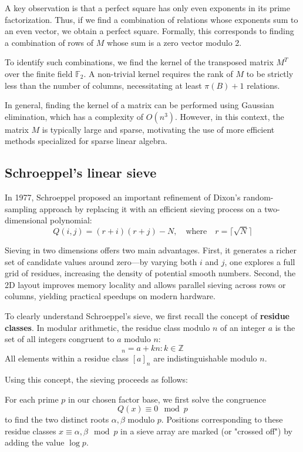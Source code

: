 \documentclass[a4paper, 11pt]{article}
\begin{document}
A key observation is that a perfect square has only even exponents in its prime factorization. Thus, if we find a combination of relations whose exponents sum to an even vector, we obtain a perfect square. Formally, this corresponds to finding a combination of rows of $M$ whose sum is a zero vector modulo 2.

To identify such combinations, we find the kernel of the transposed matrix $M^T$ over the finite field $\mathbb{F}_2$. A non-trivial kernel requires the rank of $M$ to be strictly less than the number of columns, necessitating at least $\pi(B)+1$ relations.

In general, finding the kernel of a matrix can be performed using Gaussian elimination, which has a complexity of $O(n^3)$. However, in this context, the matrix $M$ is typically large and sparse, motivating the use of more efficient methods specialized for sparse linear algebra.

\subsection{Schroeppel's linear sieve}
In 1977, Schroeppel proposed an important refinement of Dixon's random-sampling approach by replacing it with an efficient sieving process on a two-dimensional polynomial:
\begin{equation}
Q(i,j) = (r+i)(r+j) - N, \quad \text{where} \quad r = \bigl\lceil\sqrt{N}\bigr\rceil
\end{equation}

Sieving in two dimensions offers two main advantages. First, it generates a richer set of candidate values around zero—by varying both $i$ and $j$, one explores a full grid of residues, increasing the density of potential smooth numbers. Second, the 2D layout improves memory locality and allows parallel sieving across rows or columns, yielding practical speedups on modern hardware.

To clearly understand Schroeppel's sieve, we first recall the concept of \textbf{residue classes}. In modular arithmetic, the residue class modulo $n$ of an integer $a$ is the set of all integers congruent to $a$ modulo $n$:
\begin{equation}
[a]_n = { a + kn : k \in \mathbb{Z}}
\end{equation}
All elements within a residue class $[a]_n$ are indistinguishable modulo $n$.

Using this concept, the sieving proceeds as follows:

For each prime $p$ in our chosen factor base, we first solve the congruence
\begin{equation}
Q(x) \equiv 0 \mod p
\end{equation}
to find the two distinct roots $\alpha, \beta$ modulo $p$. Positions corresponding to these residue classes $x \equiv \alpha, \beta \mod p$ in a sieve array are marked (or "crossed off") by adding the value $\log p$.
\end{document}
